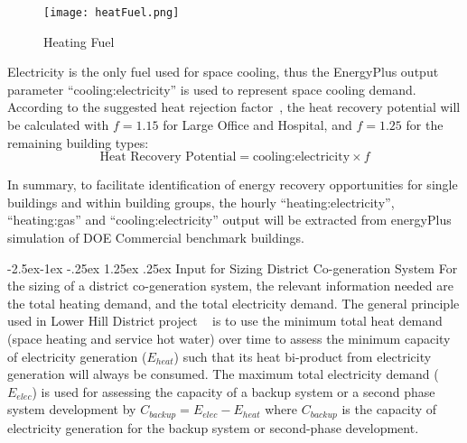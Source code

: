 \documentclass[hidelinks,12pt]{article}
\makeatletter
\renewcommand\paragraph{\@startsection{paragraph}{4}{\z@}%
            {-2.5ex\@plus -1ex \@minus -.25ex}%
            {1.25ex \@plus .25ex}%
            {\normalfont\normalsize\bfseries}}
\makeatother
\begin{document}
\begin{figure}[h!]
  \centering
  \texttt{[image: heatFuel.png]}
  \caption{Heating Fuel}
  \label{fig:heatFuel}
\end{figure}
Electricity is the only fuel used for space cooling, thus the
EnergyPlus output parameter ``cooling:electricity'' is used to
represent space cooling demand. According to the suggested heat
rejection factor~\cite{Bhatia2015}, the heat recovery potential will
be calculated with $f = 1.15$ for Large Office and Hospital, and
$f = 1.25$ for the remaining building types:
$$\text{Heat Recovery Potential} = \text{cooling:electricity} \times f$$

In summary, to facilitate identification of energy recovery
opportunities for single buildings and within building groups, the
hourly ``heating:electricity'', ``heating:gas'' and
``cooling:electricity'' output will be extracted from energyPlus
simulation of DOE Commercial benchmark buildings.

\paragraph{Input for Sizing District Co-generation System}
For the sizing of a district co-generation system, the relevant
information needed are the total heating demand, and the total
electricity demand. The general principle used in Lower Hill District
project ~\cite{baird2014} is to use the minimum total heat demand
(space heating and service hot water) over time to assess the minimum
capacity of electricity generation ($E_{heat}$) such that its heat
bi-product from electricity generation will always be consumed. The
maximum total electricity demand ($E_{elec}$) is used for assessing
the capacity of a backup system or a second phase system development
by $C_{backup} = E_{elec} - E_{heat}$ where $C_{backup}$ is the
capacity of electricity generation for the backup system or
second-phase development.
\end{document}

